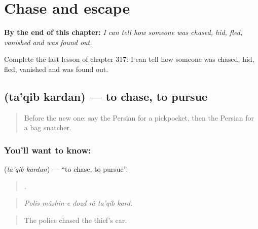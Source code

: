 
\chapter{Chase and escape}
\label{ch:fa-chase-and-escape}

\begin{chapteropening}
\textbf{By the end of this chapter:} \emph{I can tell how someone was chased, hid, fled, vanished and was found out.}

Complete the last lesson of chapter 317: I can tell how someone was chased, hid, fled, vanished and was found out.
\end{chapteropening}

\section[\texorpdfstring{\fa{تعقیب} \fa{کردن} (ta'qib kardan)}{تعقیب کردن (ta'qib kardan)}]{  (ta'qib kardan) — to chase, to pursue}

\label{lesson:FA-C317-taqib-kardan}



\begin{quote}
Before the new one: say the Persian for a pickpocket, then the Persian for a bag snatcher.
\end{quote}

\subsection*{You'll want to know:  }
\textbf{ } (\emph{ta'qib kardan}) — \textquotedblleft{}to chase, to pursue\textquotedblright{}.

\begin{quote}
     .
\end{quote}

\begin{quote}
\emph{Polis mâshin-e dozd râ ta'qib kard.}
\end{quote}

\begin{quote}
The police chased the thief's car.
\end{quote}

